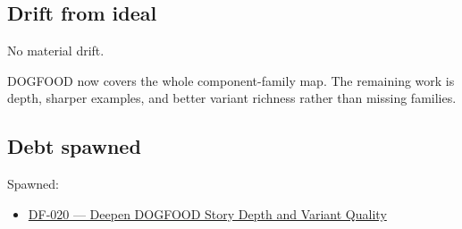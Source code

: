 \subsection{Drift from ideal}\label{record-081-drift-from-ideal}

No material drift.

DOGFOOD now covers the whole component-family map. The remaining work is depth, sharper examples, and better variant richness rather than missing families.

\subsection{Debt spawned}\label{record-081-debt-spawned}

Spawned:

\begin{itemize}
\tightlist
\item
  \href{https://github.com/flyingrobots/bijou/blob/cbd70612140e7a450d764b3c7be1c6af878b99bc/docs/method/graveyard/legacy-backlog/up-next/DF-020-deepen-dogfood-story-depth-and-variant-quality.md}{DF-020 --- Deepen DOGFOOD Story Depth and Variant Quality}
\end{itemize}

